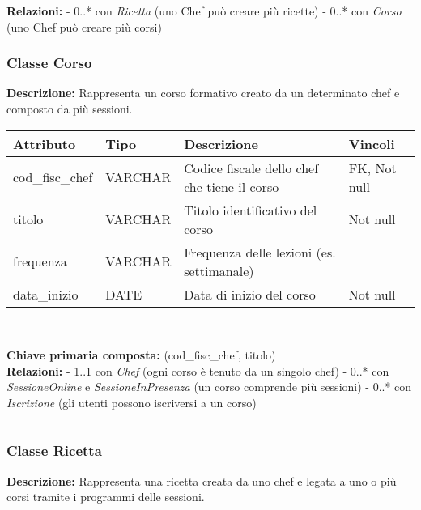 \documentclass[a4paper, 12pt]{article}
\begin{document}
        \noindent\textbf{Relazioni:}  
        - 0..* con \textit{Ricetta} (uno Chef può creare più ricette)  
        - 0..* con \textit{Corso} (uno Chef può creare più corsi)

    \newpage

    \subsubsection*{Classe Corso}
        \textbf{Descrizione:} Rappresenta un corso formativo creato da un determinato chef e composto da più sessioni.
        
        {
        \vspace{1em}
        \renewcommand{\arraystretch}{1.3}
        \begin{tabularx}{\textwidth}{|l|l|X|l|}
            \hline
            \textbf{Attributo} & \textbf{Tipo} & \textbf{Descrizione} & \textbf{Vincoli} \\
            \hline
            cod\_fisc\_chef & VARCHAR      & Codice fiscale dello chef che tiene il corso & FK, Not null \\
            titolo          & VARCHAR      & Titolo identificativo del corso & Not null \\
            frequenza       & VARCHAR      & Frequenza delle lezioni (es. settimanale) & \\
            data\_inizio    & DATE         & Data di inizio del corso & Not null \\
            \hline
            \end{tabularx}\\[0.5em]
        }
        
        \noindent\textbf{Chiave primaria composta:} (cod\_fisc\_chef, titolo)\\[0.1em]  
        
        \noindent\textbf{Relazioni:}  
        - 1..1 con \textit{Chef} (ogni corso è tenuto da un singolo chef)  
        - 0..* con \textit{SessioneOnline} e \textit{SessioneInPresenza} (un corso comprende più sessioni)  
        - 0..* con \textit{Iscrizione} (gli utenti possono iscriversi a un corso)

    \noindent\rule{\textwidth}{0.1pt}

    \subsubsection*{Classe Ricetta}
        \textbf{Descrizione:} Rappresenta una ricetta creata da uno chef e legata a uno o più corsi tramite i programmi delle sessioni.
        
\end{document}
